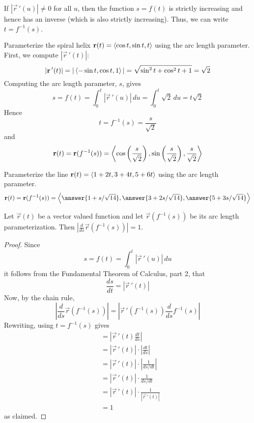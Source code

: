 \documentclass[handout]{ximera}
\begin{document}
If $|\vec r\,'(u)| \neq 0$ for all $u$, then the function $s = f(t)$ is strictly increasing and hence has an inverse (which is also strictly increasing).
Thus, we can write $t = f^{-1}(s)$.

\begin{example}[Example 2]
Parameterize the spiral helix $\mathbf r(t) = \left\langle \cos t, \sin t, t\right\rangle$ using the arc length parameter.\\
First, we compute $|\vec r\,'(t)|$:
\[
|\mathbf r\,'(t)| = |\left\langle -\sin t, \cos t, 1\right\rangle| = \sqrt{\sin^2 t + \cos^2 t + 1} = \sqrt 2
\]
Computing the arc length parameter, $s$, gives
\[
s = f(t) = \int_0^t |\vec r\,'(u)| \, du = \int_0^t \sqrt 2 \, du = t \sqrt 2
\]
Hence
\[
t = f^{-1}(s) = \frac{s}{\sqrt 2}
\]
and 
\[
\mathbf r(t) = \mathbf r(f^{-1}(s)) = \left\langle \cos \left(\frac{s}{\sqrt 2}\right), \sin \left(\frac{s}{\sqrt 2}\right),\frac{s}{\sqrt 2}\right\rangle
\]
\end{example}


\begin{problem}[Problem 2]
Parameterize the line $\mathbf r(t) =\left\langle 1+2t, 3+4t, 5+6t\right\rangle$ using the arc length parameter.
\[
\vec r(t) = \vec r(f^{-1}(s)) = \vector{\answer{1 + s/\sqrt{14}}, \answer{3 + 2s/\sqrt{14}}, \answer{5 + 3s/\sqrt{14}}}
\]
\end{problem}




\begin{proposition}
Let $\vec r(t)$ be a vector valued function and let $\vec r(f^{-1}(s))$ be its arc length parameterization.
Then $\left| \frac{d}{ds} \vec r(f^{-1}(s))\right| = 1$.\\
\end{proposition}
\begin{proof}
Since 
\[
s = f(t) = \int_0^t |\vec r \,'(u)|\, du
\]
it follows from the Fundamental Theorem of Calculus, part 2, that
\[
\frac{ds}{dt} = |\vec r \,'(t)|
\]
Now, by the chain rule,
\[
 \left| \frac{d}{ds} \vec r(f^{-1}(s)) \right| = \left|\vec r\,'(f^{-1}(s)) \frac{d}{ds} f^{-1}(s)\right|
 \]
 Rewriting, using $t = f^{-1}(s)$ gives
 \begin{align*}
 &= \left|\vec r\,'(t) \frac{dt}{ds} \right|\\
 &= \left|  \vec r\,'(t)\right| \cdot \left|\frac{dt}{ds}\right|\\
                                             &= \left|  \vec r\,'(t)\right| \cdot \left|\frac{1}{ds/dt}\right|\\
                                             &= \left|  \vec r\,'(t)\right| \cdot \frac{1}{ds/dt}\\
                                             &=\left|  \vec r\,'(t)\right| \cdot \frac{1}{ \left|  \vec r\,'(t)\right|}\\
                                             &= 1
\end{align*}
as claimed.
\end{proof}
\end{document}
